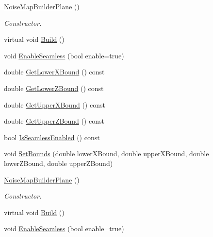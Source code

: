 \begin{DoxyCompactItemize}
\item 
\hyperlink{classnoise_1_1utils_1_1_noise_map_builder_plane_ab5aac73f30890f1985603a5890c8c789}{Noise\+Map\+Builder\+Plane} ()
\begin{DoxyCompactList}\small\item\em Constructor. \end{DoxyCompactList}\item 
virtual void \hyperlink{classnoise_1_1utils_1_1_noise_map_builder_plane_a81d553c3215dc657dfe2cdbc3264a045}{Build} ()
\item 
void \hyperlink{classnoise_1_1utils_1_1_noise_map_builder_plane_aaeb5753c662ab9357ac124e06be31b22}{Enable\+Seamless} (bool enable=true)
\item 
double \hyperlink{classnoise_1_1utils_1_1_noise_map_builder_plane_a7fcdf629f25bf97dc105bd218e04e2f7}{Get\+Lower\+X\+Bound} () const 
\item 
double \hyperlink{classnoise_1_1utils_1_1_noise_map_builder_plane_accdd95d5332d919e2420ec0b6b74de3c}{Get\+Lower\+Z\+Bound} () const 
\item 
double \hyperlink{classnoise_1_1utils_1_1_noise_map_builder_plane_a676f8ad0d645990b95faa18052afd380}{Get\+Upper\+X\+Bound} () const 
\item 
double \hyperlink{classnoise_1_1utils_1_1_noise_map_builder_plane_a57893a6512748aec267e9c186d30f925}{Get\+Upper\+Z\+Bound} () const 
\item 
bool \hyperlink{classnoise_1_1utils_1_1_noise_map_builder_plane_a2ed067659249fa28e4220166cb221ce7}{Is\+Seamless\+Enabled} () const 
\item 
void \hyperlink{classnoise_1_1utils_1_1_noise_map_builder_plane_a64bae7af3e301fafe7fe887b26029d98}{Set\+Bounds} (double lower\+X\+Bound, double upper\+X\+Bound, double lower\+Z\+Bound, double upper\+Z\+Bound)
\item 
\hyperlink{classnoise_1_1utils_1_1_noise_map_builder_plane_a519a899dc1915d448046d9b19e324205}{Noise\+Map\+Builder\+Plane} ()
\begin{DoxyCompactList}\small\item\em Constructor. \end{DoxyCompactList}\item 
virtual void \hyperlink{classnoise_1_1utils_1_1_noise_map_builder_plane_a5a22db6eda87825af47cfa598d4c1fb4}{Build} ()
\item 
void \hyperlink{classnoise_1_1utils_1_1_noise_map_builder_plane_aaeb5753c662ab9357ac124e06be31b22}{Enable\+Seamless} (bool enable=true)

\end{DoxyCompactItemize}
